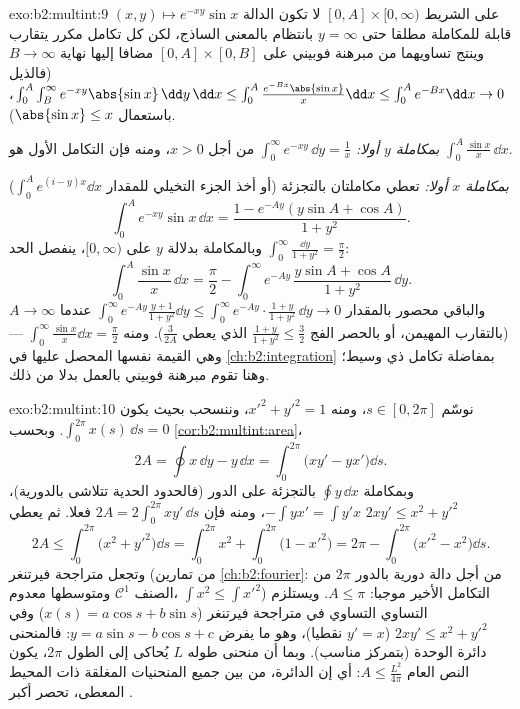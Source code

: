 \begin{solution}{exo:b2:multint:9}
على الشريط $[0, A] \times [0, \infty)$ لا تكون الدالة $(x, y)
\mapsto e^{-xy}\sin x$ قابلة للمكاملة مطلقا حتى
$y =
\infty$ بانتظام بالمعنى الساذج، لكن كل تكامل مكرر يتقارب وينتج تساويهما
من مبرهنة فوبيني على $[0, A]
\times [0, B]$ مضافا إليها نهاية $B \to \infty$ (فالذيل $\int_0^A\int_B^\infty e^{-xy}\abs{\sin x}\,\dd y\,\dd x \leq
\int_0^A \frac{e^{-Bx}\abs{\sin x}}{x}\dd x \leq \int_0^A e^{-Bx}
\dd x\to 0$،
باستعمال $\abs{\sin x} \leq x$).

\emph{بمكاملة $y$ أولا:} $\int_0^\infty e^{-xy}\,\dd y = \frac1x$ من أجل $x
> 0$، ومنه فإن التكامل
الأول هو $\int_0^A \frac{\sin x}{x}\,\dd x$.

\emph{بمكاملة $x$ أولا:} تعطي مكاملتان بالتجزئة (أو أخذ الجزء
التخيلي للمقدار $\int_0^A e^{(i - y)x}\dd x$)
\[
\int_0^A e^{-xy}\sin x\,\dd x
= \frac{1 - e^{-Ay}(y\sin A + \cos A)}{1 + y^2} .
\]
وبالمكاملة بدلالة $y$ على $[0, \infty)$، ينفصل الحد $\int_0^\infty
\frac{\dd y}{1 + y^2} = \frac\pi2$:
\[
\int_0^A \frac{\sin x}{x}\,\dd x
= \frac{\pi}{2}
- \int_0^\infty e^{-Ay}\,\frac{y\sin A + \cos A}{1 + y^2}\,\dd y .
\]
والباقي محصور بالمقدار $\int_0^\infty e^{-Ay}\frac{y +
1}{1 + y^2}\dd y \leq \int_0^\infty e^{-Ay}\cdot\frac{1+y}{1+y^2}
\,\dd y \to 0$ عندما $A \to \infty$ (بالتقارب المهيمن، أو
بالحصر الفج $\frac{1 + y}{1 + y^2} \leq \frac32$ الذي يعطي $\frac{3}{2A}$). ومنه $\int_0^\infty\frac{\sin x}{x}\dd x =
\frac\pi2$ --- وهي القيمة
نفسها المحصل عليها في \cref{ch:b2:integration} بمفاضلة تكامل ذي وسيط؛ وهنا تقوم
مبرهنة فوبيني بالعمل بدلا من ذلك.
\end{solution}

\begin{solution}{exo:b2:multint:10}
نوسّم  $s \in [0, 2\pi]$، ومنه $x'^2 + y'^2 = 1$، وننسحب بحيث يكون $\int_0^{2\pi} x(s)\,\dd s = 0$.
وبحسب \cref{cor:b2:multint:area}،
\[
2A = \oint x\,\dd y - y\,\dd x
= \int_0^{2\pi}\bigl(xy' - yx'\bigr)\dd s .
\]
وبمكاملة $\oint y\,\dd x$ بالتجزئة على الدور (فالحدود الحدية تتلاشى بالدورية)،
$-\int yx' = \int y'x$، ومنه فإن $2A = 2\int_0^{2\pi}xy'\,\dd s$ فعلا. ثم يعطي $2xy' \leq x^2 + y'^2$
\[
2A \leq \int_0^{2\pi}\bigl(x^2 + y'^2\bigr)\dd s
= \int_0^{2\pi} x^2 + \int_0^{2\pi}\bigl(1 - x'^2\bigr)
= 2\pi - \int_0^{2\pi}\bigl(x'^2 - x^2\bigr)\dd s .
\]
وتجعل متراجحة فيرتنغر (من تمارين \cref{ch:b2:fourier}: من أجل دالة دورية بالدور
$2\pi$ من الصنف $\mathcal{C}^1$ ومتوسطها معدوم، $\int x^2 \leq \int x'^2$) التكامل الأخير
موجبا: $A \leq \pi$. ويستلزم التساوي التساوي في متراجحة فيرتنغر ($x(s) =
a\cos s + b\sin s$)
وفي $2xy' \leq x^2 + y'^2$ ($y' = x$ نقطيا)، وهو ما يفرض $y = a\sin s - b\cos s + c$: فالمنحنى دائرة
الوحدة (بتمركز مناسب). وبما أن منحنى طوله $L$ يُحاكى إلى الطول
$2\pi$، يكون النص العام $A \leq
\frac{L^2}{4\pi}$: أي إن الدائرة، من بين جميع
المنحنيات المغلقة ذات المحيط المعطى، تحصر أكبر .
\end{solution}

